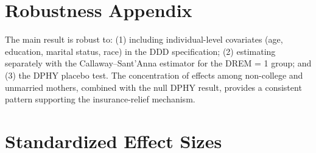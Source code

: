 \documentclass[12pt]{article}
\begin{document}
\section{Robustness Appendix}

The main result is robust to: (1) including individual-level covariates (age, education, marital status, race) in the DDD specification; (2) estimating separately with the Callaway--Sant'Anna estimator for the DREM = 1 group; and (3) the DPHY placebo test. The concentration of effects among non-college and unmarried mothers, combined with the null DPHY result, provides a consistent pattern supporting the insurance-relief mechanism.

\section{Standardized Effect Sizes}
\label{sec:sde}


\end{document}

